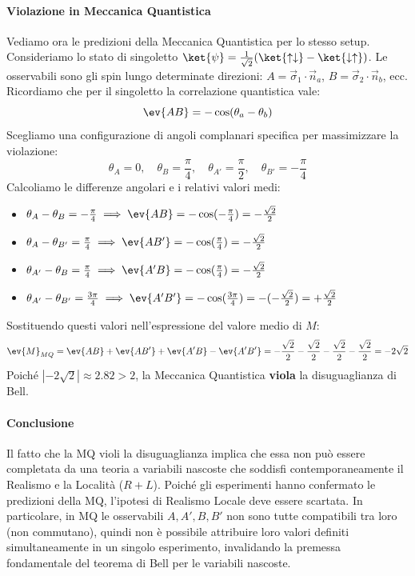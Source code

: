 \paragraph{Violazione in Meccanica Quantistica}
Vediamo ora le predizioni della Meccanica Quantistica per lo stesso setup. Consideriamo lo stato di singoletto $\ket{\psi} = \frac{1}{\sqrt{2}}(\ket{\uparrow\downarrow} - \ket{\downarrow\uparrow})$.
Le osservabili sono gli spin lungo determinate direzioni: $A = \vec{\sigma}_1 \cdot \vec{n}_a$, $B = \vec{\sigma}_2 \cdot \vec{n}_b$, ecc.
Ricordiamo che per il singoletto la correlazione quantistica vale:
\[
    \ev{AB} = -\cos(\theta_a - \theta_b)
\]
Scegliamo una configurazione di angoli complanari specifica per massimizzare la violazione:
\[
    \theta_A = 0, \quad \theta_B = \frac{\pi}{4}, \quad \theta_{A'} = \frac{\pi}{2}, \quad \theta_{B'} = -\frac{\pi}{4}
\]
Calcoliamo le differenze angolari e i relativi valori medi:
\begin{itemize}
    \item $\theta_A - \theta_B = -\frac{\pi}{4} \implies \ev{AB} = -\cos(-\frac{\pi}{4}) = -\frac{\sqrt{2}}{2}$
    \item $\theta_A - \theta_{B'} = \frac{\pi}{4} \implies \ev{AB'} = -\cos(\frac{\pi}{4}) = -\frac{\sqrt{2}}{2}$
    \item $\theta_{A'} - \theta_B = \frac{\pi}{4} \implies \ev{A'B} = -\cos(\frac{\pi}{4}) = -\frac{\sqrt{2}}{2}$
    \item $\theta_{A'} - \theta_{B'} = \frac{3\pi}{4} \implies \ev{A'B'} = -\cos(\frac{3\pi}{4}) = -(-\frac{\sqrt{2}}{2}) = +\frac{\sqrt{2}}{2}$
\end{itemize}
Sostituendo questi valori nell'espressione del valore medio di $M$:
\[
    \ev{M}_{MQ} = \ev{AB} + \ev{AB'} + \ev{A'B} - \ev{A'B'} 
    = -\frac{\sqrt{2}}{2} - \frac{\sqrt{2}}{2} - \frac{\sqrt{2}}{2} - \frac{\sqrt{2}}{2} = -2\sqrt{2}
\]
Poiché $|-2\sqrt{2}| \approx 2.82 > 2$, la Meccanica Quantistica \textbf{viola} la disuguaglianza di Bell.

\paragraph{Conclusione}
Il fatto che la MQ violi la disuguaglianza implica che essa non può essere completata da una teoria a variabili nascoste che soddisfi contemporaneamente il Realismo e la Località ($R+L$). Poiché gli esperimenti hanno confermato le predizioni della MQ, l'ipotesi di Realismo Locale deve essere scartata. In particolare, in MQ le osservabili $A, A', B, B'$ non sono tutte compatibili tra loro (non commutano), quindi non è possibile attribuire loro valori definiti simultaneamente in un singolo esperimento, invalidando la premessa fondamentale del teorema di Bell per le variabili nascoste.



